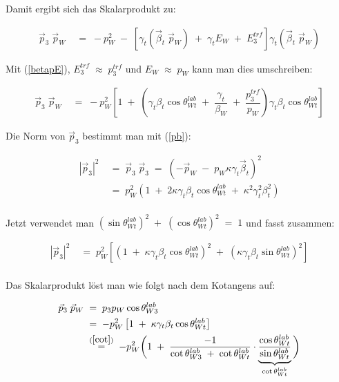 \documentclass[
a4paper,                                %
twoside,                                %
BCOR1.4cm,                      %
ngerman,                                %
10pt,                           %
headings=normal,                %
headsepline,                    %
clearplainpage, %
final,                                  %
div=14,
parskip=full
]{scrbook}
\begin{document}
Damit ergibt sich das Skalarprodukt zu:

\begin{align}
	\vec{p}_{3}\;\vec{p}_{W}
\;&=\;
	-p_{W}^{2}\;-\;\left[
		\gamma_{t} \left(\vec{\beta}_{t}\;\vec{p}_{W}\right)
		\;+\;\gamma_{t} E_{W}\;+\;E_{3}^{trf}
	\right]\gamma_{t} \left(\vec{\beta}_{t}\;\vec{p}_{W}\right)
\nonumber
\end{align}

Mit (\ref{betapE}),  
$ E_{3}^{trf}\;\approx\;p_{3}^{trf} $
  und 
$ E_{W}\;\approx\;p_{W} $
kann man dies umschreiben:

\begin{align}
	\vec{p}_{3}\;\vec{p}_{W}
\;&=\;
	-p_{W}^{2} \left[
		1\;+\;\left(
			\gamma_{t} \beta_{t} \cos \theta_{Wt}^{lab}
			\;+\;\dfrac{\gamma_{t}}{\beta_{W}}
			\;+\;\dfrac{p_{3}^{trf}}{p_{W}}	
		\right)\gamma_{t} \beta_{t} \cos \theta_{Wt}^{lab}
	\right]
\end{align}

Die Norm von $ \vec{p}_{3} $ bestimmt man mit (\ref{pb}):

\begin{align}
	|\vec{p}_{3}|^{2}
\;&=\;
	\vec{p}_{3}\;\vec{p}_{3}
\;=\;
	\left(-\vec{p}_{W}\;-\;p_{W} \kappa \gamma_{t} \vec{\beta}_{t} \right)^{2}
\nonumber
\\
\;&=\;
	p_{W}^{2} \left(1\;+\;2 \kappa \gamma_{t} \beta_{t} \cos \theta_{Wt}^{lab}
		\;+\;\kappa^{2} \gamma_{t}^{2} \beta_{t}^{2} \right)
\nonumber
\\
\nonumber
\end{align}

Jetzt verwendet man 
$ \left(\sin \theta_{Wt}^{lab}\right)^{2}
\;+\;\left(\cos \theta_{Wt}^{lab}\right)^{2}\;=\;1 $
 und fasst zusammen:

\begin{align}
	|\vec{p}_{3}|^{2}
\;&=\;
	p_{W}^{2} \left[
		\left(1\;+\;\kappa \gamma_{t} \beta_{t} \cos \theta_{Wt}^{lab}\right)^{2}
		\;+\;\left(\kappa \gamma_{t} \beta_{t} \sin \theta_{Wt}^{lab}\right)^{2} 
	\right]
\\
\nonumber
\end{align}

Das Skalarprodukt l\"ost man wie folgt nach dem Kotangens auf:

\begin{align}
	\vec{p}_{3}\;\vec{p}_{W}
\;&=\;%
	p_{3} p_{W} \cos \theta_{W3}^{lab}
\nonumber
\\
\;&=\;
	-p_{W}^{2} \left[
		1\;+\;\kappa \gamma_{t} \beta_{t} \cos \theta_{Wt}^{lab}
	\right]
\nonumber
\\
\;&\stackrel{\mathrm{(\ref{cot})}}=\;
	-p_{W}^{2}\bigg(
		1\;+\;
		\dfrac{-1}{\cot \theta_{W3}^{lab}\;+\;\cot \theta_{Wt}^{lab}}\cdot
		\underbrace{\dfrac{\cos \theta_{Wt}^{lab}}{\sin \theta_{Wt}^{lab}}}
		_{\cot \theta_{Wt}^{lab}}
	\bigg)
\nonumber
\\
\nonumber
\\
\end{align}
\end{document}
